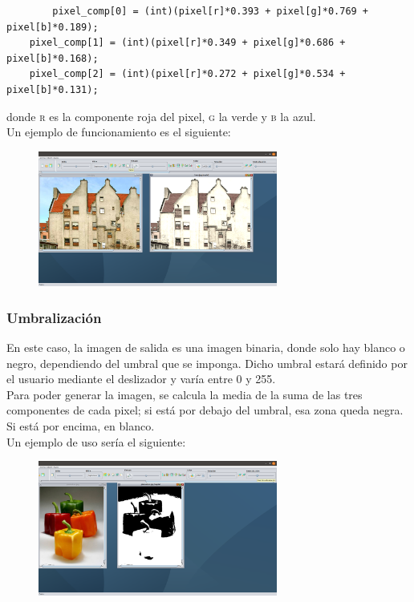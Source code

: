 \documentclass[11pt,a4paper]{article}
\begin{document}
\begin{lstlisting}
		pixel_comp[0] = (int)(pixel[r]*0.393 + pixel[g]*0.769 + pixel[b]*0.189);
    pixel_comp[1] = (int)(pixel[r]*0.349 + pixel[g]*0.686 + pixel[b]*0.168);
    pixel_comp[2] = (int)(pixel[r]*0.272 + pixel[g]*0.534 + pixel[b]*0.131);
\end{lstlisting}

donde \textsc{r} es la componente roja del pixel, \textsc{g} la verde y \textsc{b} la azul.\\

Un ejemplo de funcionamiento es el siguiente:

\begin{figure}[H]
\centering
	\includegraphics[width=0.7\textwidth]{img/sepia.png}
\end{figure}

\subsubsection{Umbralización}
En este caso, la imagen de salida es una imagen binaria, donde solo hay blanco o negro, dependiendo del umbral que se imponga. Dicho umbral estará definido por el usuario mediante el deslizador y varía entre 0 y 255.\\

Para poder generar la imagen, se calcula la media de la suma de las tres componentes de cada pixel; si está por debajo del umbral, esa zona queda negra. Si está por encima, en blanco.\\

Un ejemplo de uso sería el siguiente:

\begin{figure}[H]
\centering
	\includegraphics[width=0.7\textwidth]{img/umbral.png}
\end{figure}
\end{document}
